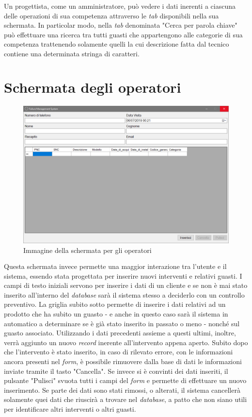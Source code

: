 \documentclass[a4paper, 12pt]{report}
\begin{document}
Un progettista, come un amministratore, può vedere i dati inerenti a ciascuna delle operazioni di sua competenza attraverso le \textit{tab} disponibili nella sua schermata. In particolar
modo, nella \textit{tab} denominata "Cerca per parola chiave" può effettuare una ricerca tra tutti guasti che appartengono alle categorie di sua competenza trattenendo solamente quelli
la cui descrizione fatta dal tecnico contiene una determinata stringa di caratteri.

\section{Schermata degli operatori}

\begin{figure}[H]
	\centering
	\includegraphics[width=\linewidth]{images/operatorScreen.png}
	\caption{Immagine della schermata per gli operatori}
\end{figure}

Questa schermata invece permette una maggior interazione tra l'utente e il sistema, essendo stata progettata per inserire nuovi interventi e relativi guasti. I campi di 
testo iniziali servono per inserire i dati di un cliente e se non è mai stato inserito all'interno del \textit{database} sarà il sistema stesso a deciderlo con un controllo preventivo.
La griglia subito sotto permette di inserire i dati relativi ad un prodotto che ha subito un guasto - e anche in questo caso sarà il sistema in automatico a determinare se è già
stato inserito in passato o meno - nonché sul guasto associato. Utilizzando i dati precedenti assieme a questi ultimi, inoltre, verrà aggiunto un nuovo \textit{record} inerente
all'intervento appena aperto. Subito dopo che l'intervento è stato inserito, in caso di rilevato errore, con le informazioni ancora presenti nel \textit{form}, è possibile rimuovere
dalla base di dati le informazioni inviate tramite il tasto "Cancella". Se invece si è convinti dei dati inseriti, il pulsante "Pulisci" svuota tutti i
campi del \textit{form} e permette di effettuare un nuovo inserimento. Se parte dei dati sono stati rimossi, o alterati, il sistema cancellerà solamente quei dati che riuscirà
a trovare nel \textit{database}, a patto che non siano utili per identificare altri interventi o altri guasti.
\end{document}
